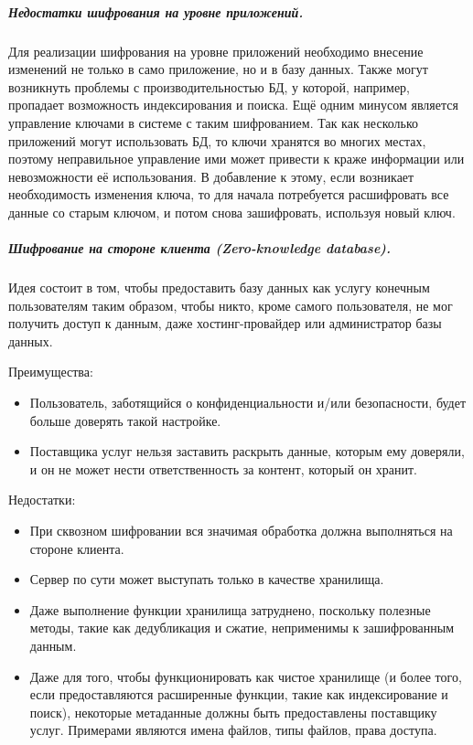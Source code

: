 \subparagraph{Недостатки шифрования на уровне приложений.}

Для реализации шифрования на уровне приложений необходимо внесение изменений не только в само
приложение, но и в базу данных. Также могут возникнуть проблемы с производительностью БД, у
которой, например, пропадает возможность индексирования и поиска. Ещё одним минусом является
управление ключами в системе с таким шифрованием. Так как несколько приложений могут использовать
БД, то ключи хранятся во многих местах, поэтому неправильное управление ими может привести к краже
информации или невозможности её использования. В добавление к этому, если возникает необходимость
изменения ключа, то для начала потребуется расшифровать все данные со старым ключом, и потом снова
зашифровать, используя новый ключ.

\subparagraph{Шифрование на стороне клиента (Zero-knowledge database).}

Идея состоит в том, чтобы предоставить базу данных как услугу конечным пользователям таким образом,
чтобы никто, кроме самого пользователя, не мог получить доступ к данным, даже хостинг-провайдер
или администратор базы данных.

Преимущества:
\begin{itemize}
    \item Пользователь, заботящийся о конфиденциальности и/или безопасности, будет больше доверять
        такой настройке.
    \item Поставщика услуг нельзя заставить раскрыть данные, которым ему доверяли, и он не может
        нести ответственность за контент, который он хранит.
\end{itemize}

Недостатки:
\begin{itemize}
    \item При сквозном шифровании вся значимая обработка должна выполняться на стороне клиента.
    \item Сервер по сути может выступать только в качестве хранилища.
    \item Даже выполнение функции хранилища затруднено, поскольку полезные методы, такие как
        дедубликация и сжатие, неприменимы к зашифрованным данным.
    \item Даже для того, чтобы функционировать как чистое хранилище (и более того, если
        предоставляются расширенные функции, такие как индексирование и поиск), некоторые
        метаданные должны быть предоставлены поставщику услуг. Примерами являются имена файлов,
        типы файлов, права доступа.
\end{itemize}

